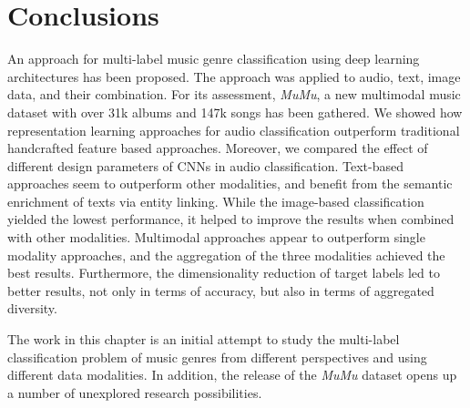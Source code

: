 
\section{Conclusions}\label{sec:multi-class:conclusions}

An approach for multi-label music genre classification using deep learning architectures has been proposed. 
The approach was applied to audio, text, image data, and their combination. 
For its assessment, \emph{MuMu}, a new multimodal music dataset with over 31k albums and 147k songs has been gathered. 
We showed how representation learning approaches for audio classification outperform traditional handcrafted feature based approaches.
Moreover, we compared the effect of different design parameters of CNNs in audio classification. 
Text-based approaches seem to outperform other modalities, and benefit from the semantic enrichment of texts via entity linking. %
While the image-based classification yielded the lowest performance, it helped to improve the results when combined with other modalities.
Multimodal approaches appear to outperform single modality approaches, and the aggregation of the three modalities achieved the best results.
Furthermore, the dimensionality reduction of target labels led to better results, not only in terms of accuracy, but also in terms of aggregated diversity.

The work in this chapter is an initial attempt to study the multi-label classification problem of music genres from different perspectives and using different data modalities. In addition, the release of the \emph{MuMu} dataset opens up a number of unexplored research possibilities. %